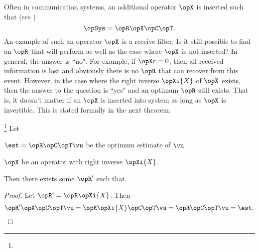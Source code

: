 Often in communication systems, an additional  operator $\opX$ is
inserted such that (see )
   \[ \opSys = \opR\opX\opC\opT.\]
An example of such an operator $\opX$ is a receive filter.
Is it still possible to find an $\opR$ that will perform as well as
the case where $\opX$ is not inserted?
In general, the answer is ``no".
For example, if $\opX r=0$, then all received information is lost
and obviously there is no $\opR$ that can recover from this event.
However, in the case where the right inverse $\opXi{X}$ of $\opX$ exists,
then the answer to the question is ``yes" and an optimum  $\opR$
still exists.
That is, it doesn't matter if an $\opX$ is inserted into system
as long as $\opX$ is invertible.
This is stated formally in the next theorem.
\begin{theorem}
\footnote{
  }
\label{thm:reversibility}
Let
\begin{liste}
   \item $\est = \opR\opC\opT\vu$ be the optimum estimate of $\vu$
   \item $\opX$ be an operator with right inverse $\opXi{X}$.
\end{liste}
Then there exists some $\opR'$ such that
\end{theorem}
\begin{proof}
  Let $\opR'=\opR\opXi{X}$.
  Then
  \[ \opR'\opX\opC\opT\vu = \opR\opXi{X}\opC\opT\vu = \opR\opC\opT\vu = \est. \]
\end{proof}

